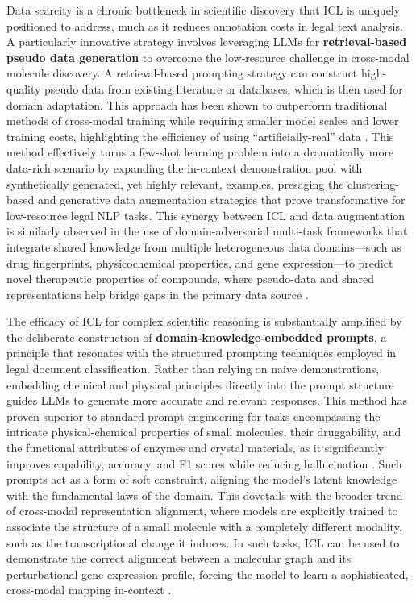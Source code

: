 \documentclass[11pt]{article}
\begin{document}
Data scarcity is a chronic bottleneck in scientific discovery that ICL is uniquely positioned to address, much as it reduces annotation costs in legal text analysis. A particularly innovative strategy involves leveraging LLMs for \textbf{retrieval-based pseudo data generation} to overcome the low-resource challenge in cross-modal molecule discovery. A retrieval-based prompting strategy can construct high-quality pseudo data from existing literature or databases, which is then used for domain adaptation. This approach has been shown to outperform traditional methods of cross-modal training while requiring smaller model scales and lower training costs, highlighting the efficiency of using ``artificially-real'' data \cite{ref559}. This method effectively turns a few-shot learning problem into a dramatically more data-rich scenario by expanding the in-context demonstration pool with synthetically generated, yet highly relevant, examples, presaging the clustering-based and generative data augmentation strategies that prove transformative for low-resource legal NLP tasks. This synergy between ICL and data augmentation is similarly observed in the use of domain-adversarial multi-task frameworks that integrate shared knowledge from multiple heterogeneous data domains---such as drug fingerprints, physicochemical properties, and gene expression---to predict novel therapeutic properties of compounds, where pseudo-data and shared representations help bridge gaps in the primary data source \cite{ref560}.

The efficacy of ICL for complex scientific reasoning is substantially amplified by the deliberate construction of \textbf{domain-knowledge-embedded prompts}, a principle that resonates with the structured prompting techniques employed in legal document classification. Rather than relying on naive demonstrations, embedding chemical and physical principles directly into the prompt structure guides LLMs to generate more accurate and relevant responses. This method has proven superior to standard prompt engineering for tasks encompassing the intricate physical-chemical properties of small molecules, their druggability, and the functional attributes of enzymes and crystal materials, as it significantly improves capability, accuracy, and F1 scores while reducing hallucination \cite{ref561}. Such prompts act as a form of soft constraint, aligning the model's latent knowledge with the fundamental laws of the domain. This dovetails with the broader trend of cross-modal representation alignment, where models are explicitly trained to associate the structure of a small molecule with a completely different modality, such as the transcriptional change it induces. In such tasks, ICL can be used to demonstrate the correct alignment between a molecular graph and its perturbational gene expression profile, forcing the model to learn a sophisticated, cross-modal mapping in-context \cite{ref562}.
\end{document}
